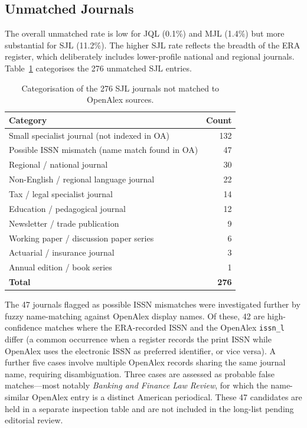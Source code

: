 \subsection{Unmatched Journals}

The overall unmatched rate is low for JQL (0.1\%) and MJL (1.4\%) but more substantial for SJL (11.2\%).
The higher SJL rate reflects the breadth of the ERA register, which deliberately includes
lower-profile national and regional journals.
Table~\ref{tab:sjl_misses} categorises the 276 unmatched SJL entries.

\begin{table}[ht]
\centering
\caption{Categorisation of the 276 SJL journals not matched to OpenAlex sources.}
\label{tab:sjl_misses}
\small
\begin{tabular}{lr}
\toprule
\textbf{Category} & \textbf{Count} \\
\midrule
Small specialist journal (not indexed in OA)   & 132 \\
Possible ISSN mismatch (name match found in OA) &  47 \\
Regional / national journal                    &  30 \\
Non-English / regional language journal        &  22 \\
Tax / legal specialist journal                 &  14 \\
Education / pedagogical journal                &  12 \\
Newsletter / trade publication                 &   9 \\
Working paper / discussion paper series        &   6 \\
Actuarial / insurance journal                  &   3 \\
Annual edition / book series                   &   1 \\
\midrule
\textbf{Total}                                 & \textbf{276} \\
\bottomrule
\end{tabular}
\end{table}

The 47 journals flagged as possible ISSN mismatches were investigated further by
fuzzy name-matching against OpenAlex display names.
Of these, 42 are high-confidence matches where the ERA-recorded ISSN and the
OpenAlex \texttt{issn\_l} differ (a common occurrence when a register records the
print ISSN while OpenAlex uses the electronic ISSN as preferred identifier, or vice versa).
A further five cases involve multiple OpenAlex records sharing the same journal name,
requiring disambiguation.
Three cases are assessed as probable false matches---most notably
\textit{Banking and Finance Law Review}, for which the name-similar OpenAlex entry is
a distinct American periodical.
These 47 candidates are held in a separate inspection table and are not included
in the long-list pending editorial review.

